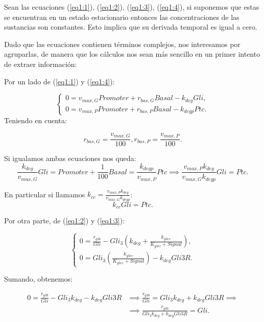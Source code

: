 Sean las ecuaciones (\ref{eq1:1}), (\ref{eq1:2}), (\ref{eq1:3}), (\ref{eq1:4}), si suponemos que estas se encuentran en un estado estacionario entonces las concentraciones de las sustancias son constantes. Esto implica que su derivada temporal es igual a cero.

Dado que las ecuaciones contienen términos complejos, nos interesamos por agruparlas, de manera que los cálculos nos sean más sencillo en un primer intento de extraer información:

Por un lado de (\ref{eq1:1}) y (\ref{eq1:4}):

$$\begin{cases} 0 = v_{max,G}Promoter+r_{bas,G}Basal-k_{deg}Gli, \\0= v_{max,P}Promoter+r_{bas,P}Basal-k_{degp}Ptc. \end{cases}$$
Teniendo en cuenta:

$$
r_{bas,G}=\frac{v_{max,G}}{100},r_{bas,P}=\frac{v_{max,P}}{100}.
$$

Si igualamos ambas ecuaciones nos queda:
\begin{equation*}
\frac{k_{deg}}{v_{max,G}}Gli=Promoter+\frac{1}{100}Basal=\frac{k_{degp}}{v_{max,P}}Ptc \implies \frac{v_{max,P}k_{deg}}{v_{max,G}k_{degp}}Gli=Ptc.
\end{equation*}

 En particular si llamamos $k_{cc}=\frac{v_{max,P}k_{deg}}{v_{max,G}k_{degp}}$:
 \begin{equation}
k_{cc}Gli=Ptc.
\label{gli-ptc}
 \end{equation}


Por otra parte, de (\ref{eq1:2}) y (\ref{eq1:3}):



$$\begin{cases} 0 = \frac{r_{g3b}}{Gli}-Gli_3\left(k_{deg}+\frac{k_{g3rc}}{K_{g3rc}+Signal}\right), \\0=Gli_3\left(\frac{k_{g3rc}}{K_{g3rc}+Signal}\right)-k_{deg}Gli3R. \end{cases}$$

Sumando, obtenemos:

\begin{equation}
\begin{split}
0=\frac{r_{g3b}}{Gli}-Gli_3k_{deg}-k_{deg}Gli3R & \implies \frac{r_{g3b}}{Gli}=Gli_3k_{deg}+k_{deg}Gli3R\implies
\\
& \implies \frac{r_{g3b}}{Gli_3k_{deg}+k_{deg}Gli3R}=Gli.
\end{split}
\label{gli3gli}
\end{equation}

